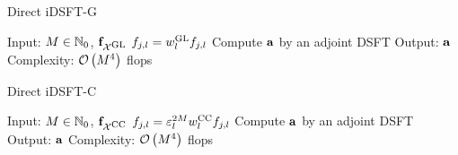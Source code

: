 \begin{algorithm}[t]
  \caption{Direct iDSFT-G}
  \label{NFSFT:directIDSFTGL}    
  \begin{algorithmic}
    \STATE Input: $M \in \mathbb{N}_{0}$, $\mathbf{f}_{\mathcal{X}^{\mbox{\scriptsize\rm{GL}}}}$
    \STATE
        \STATE $f_{j,l} = w^{\mbox{\scriptsize\rm{GL}}}_{l} f_{j,l}$ 
      \ENDFOR
    \ENDFOR
    \STATE Compute $\mathbf{a}$ by an adjoint DSFT
    \STATE
    \STATE Output: $\mathbf{a}$
    \STATE Complexity: $\mathcal{O}\left(M^4\right)$ flops
  \end{algorithmic}
\end{algorithm}
\begin{algorithm}[t]
  \caption{Direct iDSFT-C}
  \label{NFSFT:directIDSFTCC}    
  \begin{algorithmic}
    \STATE Input: $M \in \mathbb{N}_{0}$, $\mathbf{f}_{\mathcal{X}^{\mbox{\scriptsize\rm{CC}}}}$
    \STATE
        \STATE $f_{j,l} = \varepsilon_{l}^{2M} w^{\mbox{\scriptsize\rm{CC}}}_{l} f_{j,l}$ 
      \ENDFOR
    \ENDFOR
    \STATE Compute $\mathbf{a}$ by an adjoint DSFT
    \STATE
    \STATE Output: $\mathbf{a}$
    \STATE Complexity: $\mathcal{O}\left(M^4\right)$ flops
  \end{algorithmic}
\end{algorithm}





